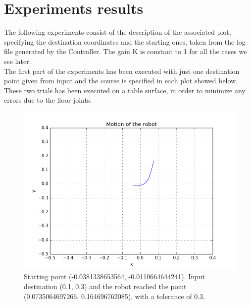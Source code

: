\documentclass[a4paper,11pt,oneside]{book}
\begin{document}
\section{Experiments results}
The following experiments consist of the description of the associated plot, specifying the destination coordinates and the starting ones, taken from the log file generated by the Controller. The gain K is constant to 1 for all the cases we see later. 
\\ The first part of the experiments has been executed with just one destination point given from input and the course is specified in each plot showed below.
\\ These two trials has been executed on a table surface, in order to minimize any errors due to the floor joints.

\begin{figure}[H]
\begin{center}
\includegraphics[width=1\textwidth]{figs/experiments/1}
\caption[Experiment: Destination (0.1, 0.3)]{Starting point (-0.0381338653564, -0.0110664644241). Input destination (0.1, 0.3) and the robot reached the point (0.0735064697266, 0.164696762085), with a tolerance of 0.3.}
\end{center}
\end{figure}
\end{document}
